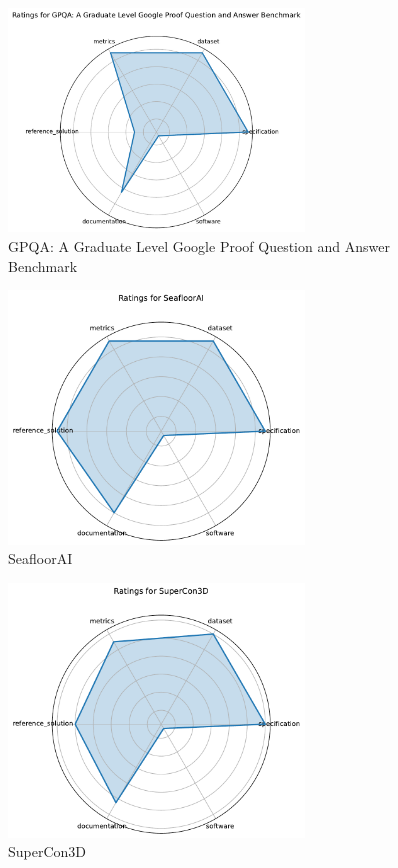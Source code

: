 \documentclass{article}
\begin{document}
\begin{figure}[h!]
  \centering
  \includegraphics[width=0.7\textwidth]{GPQA_ A Graduate Level Google Proof Question and Answer Benchmark_radar.pdf}
  \caption{GPQA: A Graduate Level Google Proof Question and Answer Benchmark}
\end{figure}

\begin{figure}[h!]
  \centering
  \includegraphics[width=0.7\textwidth]{SeafloorAI_radar.pdf}
  \caption{SeafloorAI}
\end{figure}

\begin{figure}[h!]
  \centering
  \includegraphics[width=0.7\textwidth]{SuperCon3D_radar.pdf}
  \caption{SuperCon3D}
\end{figure}
\end{document}
